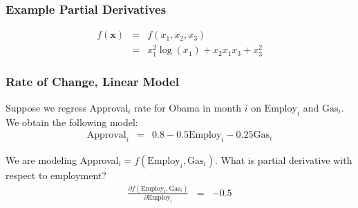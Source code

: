 \documentclass{beamer}
\numberwithin{equation}{section}
\begin{document}
\begin{frame}
\frametitle{Example Partial Derivatives}

\begin{eqnarray}
f(\boldsymbol{x}) & = & f(x_{1}, x_{2}, x_{3}) \nonumber \\
							& = & x_{1}^2 \log(x_{1}) + x_{2}x_{1}x_{3} + x_{3}^2 \nonumber 
\end{eqnarray}

\pause 
{}     








\pause\pause 





\end{frame}




\begin{frame}
\frametitle{Rate of Change, Linear Model}

Suppose we regress Approval$_{i}$ rate for Obama in month $i$ on $\text{Employ}_{i}$ and $\text{Gas}_{i}$.  We obtain the following model:
\begin{eqnarray}
\text{Approval}_{i} & = & 0.8  -0.5 \text{Employ}_{i}  -0.25 \text{Gas}_{i} \nonumber 
\end{eqnarray} \pause

We are modeling Approval$_{i} = f(\text{Employ}_{i}, \text{Gas}_{i} )$.  What is partial derivative with respect to employment?
\begin{eqnarray}
\frac{\partial f(\text{Employ}_{i}, \text{Gas}_{i} ) }{\partial \text{Employ}_{i} } & = & -0.5 \nonumber 
\end{eqnarray}


\end{frame}
\end{document}
